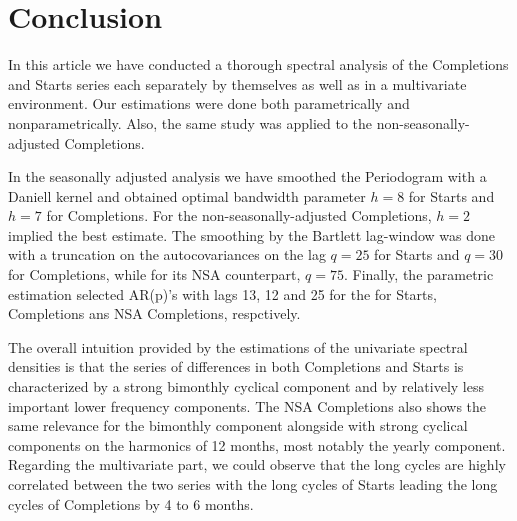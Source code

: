 \documentclass[12pt]{article} %
\begin{document}
\section{Conclusion}

In this article we have conducted a thorough spectral analysis of the Completions and Starts series each separately by themselves as well as in a multivariate environment. Our estimations were done both parametrically and nonparametrically. Also, the same study was applied to the non-seasonally-adjusted Completions.

In the seasonally adjusted analysis we have smoothed the Periodogram with a Daniell kernel and obtained optimal bandwidth parameter $h=8$ for Starts and $h=7$ for Completions. For the non-seasonally-adjusted Completions, $h=2$ implied the best estimate. The smoothing by the Bartlett lag-window was done with a truncation on the autocovariances on the lag $q=25$ for Starts and $q=30$ for Completions, while for its NSA counterpart, $q=75$. Finally, the parametric estimation selected AR(p)'s with lags 13, 12 and 25 for the for Starts, Completions ans NSA Completions, respctively.

The overall intuition provided by the estimations of the univariate spectral densities is that the series of differences in both Completions and Starts is characterized by a strong bimonthly cyclical component and by relatively less important lower frequency components. The NSA Completions also shows the same relevance for the bimonthly component alongside with strong cyclical components on the harmonics of 12 months, most notably the yearly component. Regarding the multivariate part, we could observe that the long cycles are highly correlated between the two series with the long cycles of Starts leading the long cycles of Completions by 4 to 6 months.


\label{Bibliography}

 


\end{document}
